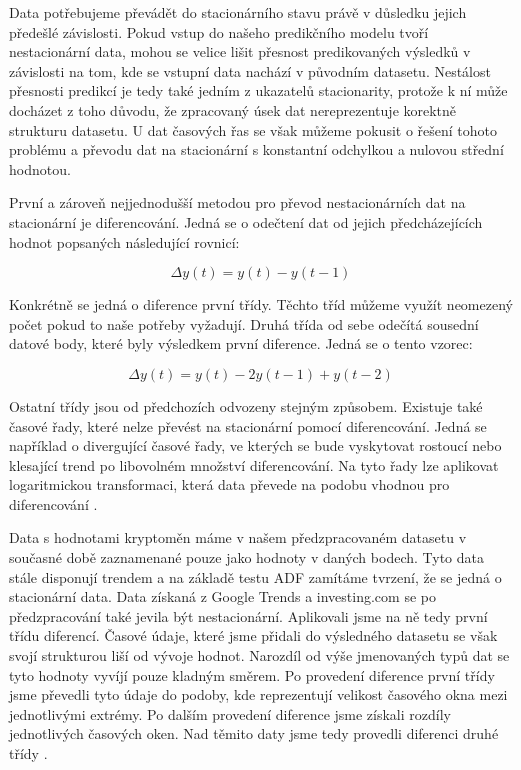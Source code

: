 Data potřebujeme převádět do stacionárního stavu právě v důsledku jejich předešlé závislosti. 
Pokud vstup do našeho predikčního modelu tvoří nestacionární data, mohou se velice lišit přesnost predikovaných výsledků v závislosti na tom, kde se vstupní data nachází v původním datasetu. 
Nestálost přesnosti predikcí je tedy také jedním z ukazatelů stacionarity, protože k ní může docházet z toho důvodu, že zpracovaný úsek dat nereprezentuje korektně strukturu datasetu. 
U dat časových řas se však můžeme pokusit o řešení tohoto problému a převodu dat na stacionární s konstantní odchylkou a nulovou střední hodnotou. 

První a zároveň nejjednodušší metodou pro převod nestacionárních dat na stacionární je diferencování. 
Jedná se o odečtení dat od jejich předcházejících hodnot popsaných následující rovnicí:

\[\Delta y(t) = y(t) - y(t-1)\]

Konkrétně se jedná o diference první třídy. 
Těchto tříd můžeme využít neomezený počet pokud to naše potřeby vyžadují. 
Druhá třída od sebe odečítá sousední datové body, které byly výsledkem první diference. 
Jedná se o tento vzorec:

\[\Delta y(t) = y(t) - 2y(t-1) + y(t-2)\]

Ostatní třídy jsou od předchozích odvozeny stejným způsobem. 
Existuje také časové řady, které nelze převést na stacionární pomocí diferencování. 
Jedná se například o divergující časové řady, ve kterých se bude vyskytovat rostoucí nebo klesající trend po libovolném množství diferencování. 
Na tyto řady lze aplikovat logaritmickou transformaci, která data převede na podobu vhodnou pro diferencování \cite{stationary:2}.

Data s hodnotami kryptoměn máme v našem předzpracovaném datasetu v současné době zaznamenané pouze jako hodnoty v daných bodech. 
Tyto data stále disponují trendem a na základě testu ADF zamítáme tvrzení, že se jedná o stacionární data. 
Data získaná z Google Trends a investing.com se po předzpracování také jevila být nestacionární. 
Aplikovali jsme na ně tedy první třídu diferencí. 
Časové údaje, které jsme přidali do výsledného datasetu se však svojí strukturou liší od vývoje hodnot. 
Narozdíl od výše jmenovaných typů dat se tyto hodnoty vyvíjí pouze kladným směrem. 
Po provedení diference první třídy jsme převedli tyto údaje do podoby, kde reprezentují velikost časového okna mezi jednotlivými extrémy. 
Po dalším provedení diference jsme získali rozdíly jednotlivých časových oken. 
Nad těmito daty jsme tedy provedli diferenci druhé třídy \cite{stationary:3}.

